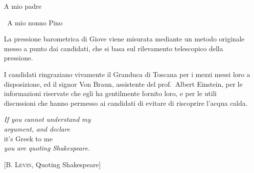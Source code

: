 \documentclass[%
	corpo=11pt,
    twoside,
    stile=classica,
    oldstyle,
    tipotesi=custom,
    greek,
    evenboxes,
]{toptesi}
\begin{document}


\ifclassica%
{\begin{dedica}
    A mio padre

    \textdagger\ A mio nonno Pino
\end{dedica}

\sommario%
La pressione barometrica di Giove viene misurata mediante un metodo originale  messo a punto dai candidati, che si basa sul rilevamento telescopico della pressione.


\ringraziamenti%
I candidati ringraziano vivamente il Granduca di Toscana per i mezzi messi loro a disposizione, ed il signor Von Braun, assistente del prof.~Albert Einstein, per le informazioni riservate che egli ha gentilmente fornito loro, e per le utili discussioni che hanno permesso ai candidati di evitare di riscoprire l'acqua calda.


\tablespagetrue\figurespagetrue%

\indici%


\ifclassica   
\begin{citazioni}
    \textit{If you cannot understand my\\argument, and declare}\\
    it's Greek to me\\
    \textit{you are quoting Shakespeare.}
    
    [\textsc{B. Levin}, Quoting Shakespeare]\vspace{1em}
\end{citazioni}
\fi


\mainmatter

}
\end{document}
